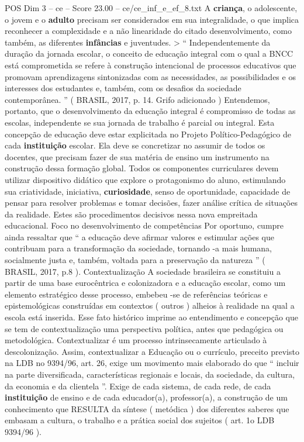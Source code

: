\begin{textsample}{POS Dim 3 – ce – Score 23.00 – ce/ce\_inf\_e\_ef\_8.txt}
A \textbf{criança}, o adolescente, o jovem e o \textbf{adulto} precisam ser considerados em sua integralidade, o que implica reconhecer a complexidade e a não linearidade do citado desenvolvimento, como também, as diferentes \textbf{infâncias} e juventudes. > “ Independentemente da duração da jornada escolar, o conceito de educação integral com o qual a BNCC está comprometida se refere à construção intencional de processos educativos que promovam aprendizagens sintonizadas com as necessidades, as possibilidades e os interesses dos estudantes e, também, com os desafios da sociedade contemporânea. ” ( BRASIL, 2017, p. 14.
Grifo adicionado ) Entendemos, portanto, que o desenvolvimento da educação integral é compromisso de todas as escolas, independente se sua jornada de trabalho é parcial ou integral.
Esta concepção de educação deve estar explicitada no Projeto Político-Pedagógico de cada \textbf{instituição} escolar.
Ela deve se concretizar no assumir de todos os docentes, que precisam fazer de sua matéria de ensino um instrumento na construção dessa formação global.
Todos os componentes curriculares devem utilizar dispositivo didático que explore o protagonismo do aluno, estimulando sua criatividade, iniciativa, \textbf{curiosidade}, senso de oportunidade, capacidade de pensar para resolver problemas e tomar decisões, fazer análise crítica de situações da realidade.
Estes são procedimentos decisivos nessa nova empreitada educacional.
Foco no desenvolvimento de competências Por oportuno, cumpre ainda ressaltar que “ a educação deve afirmar valores e estimular ações que contribuam para a transformação da sociedade, tornando -a mais humana, socialmente justa e, também, voltada para a preservação da natureza ” ( BRASIL, 2017, p.8 ).
Contextualização A sociedade brasileira se constituiu a partir de uma base eurocêntrica e colonizadora e a educação escolar, como um elemento estratégico desse processo, embebeu -se de referências teóricas e epistemológicas construídas em contextos ( outros ) alheios à realidade na qual a escola está inserida.
Esse fato histórico imprime ao entendimento e concepção que se tem de contextualização uma perspectiva política, antes que pedagógica ou metodológica.
Contextualizar é um processo intrinsecamente articulado à descolonização.
Assim, contextualizar a Educação ou o currículo, preceito previsto na LDB no 9394/96, art. 26, exige um movimento mais elaborado do que “ incluir na parte diversificada, características regionais e locais, da sociedade, da cultura, da economia e da clientela ”.
Exige de cada sistema, de cada rede, de cada \textbf{instituição} de ensino e de cada educador(a), professor(a), a construção de um conhecimento que RESULTA da síntese ( metódica ) dos diferentes saberes que embasam a cultura, o trabalho e a prática social dos sujeitos ( art. 1o LDB 9394/96 ).

\end{textsample}
